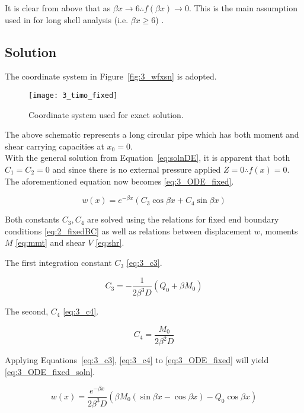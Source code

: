 It is clear from above that as $\beta x \rightarrow 6 \therefore f(\beta x) \rightarrow 0$. This is the main assumption used in for long shell analysis (i.e. $\beta x \geq 6$) \citep{roarks}.

\subsection{Solution}

The coordinate system in Figure~\ref{fig:3_wfxsn} is adopted.
\begin{figure}[H]
	\centering
	\texttt{[image: 3\_timo\_fixed]}
	\caption{Coordinate system used for exact solution. \citep{timoshenko1959theory}}
	\label{fig:CoordSyst}
\end{figure}

The above schematic represents a long circular pipe which has both moment and shear carrying capacities at $x_0=0$.\\

With the general solution from Equation~\ref{eq:solnDE}, it is apparent that both $C_1=C_2=0$ and since there is no external pressure applied $Z=0 \therefore f(x) = 0$. The aforementioned equation now becomes \ref{eq:3_ODE_fixed}.

\begin{equation}
	\label{eq:3_ODE_fixed}
	w(x)=e^{-\beta x} \left(C_3 \cos \beta x +C_4 \sin \beta x \right)
\end{equation}


Both constants $C_3, C_4$ are solved using the relations for fixed end boundary conditions \ref{eq:2_fixedBC} as well as relations between displacement $w$, moments $M$ \ref{eq:mmt} and shear $V$ \ref{eq:shr}.


The first integration constant $C_3$ \ref{eq:3_c3}.

\begin{equation}
	\label{eq:3_c3}
	C_3 = - \frac{1}{2 \beta^3 D} \left( Q_0 + \beta M_0 \right)
\end{equation}

The second, $C_4$ \ref{eq:3_c4}.

\begin{equation}
	\label{eq:3_c4}
	C_4 = \frac{M_0}{2 \beta^2 D}
\end{equation}


Applying Equations~\ref{eq:3_c3}, \ref{eq:3_c4} to \ref{eq:3_ODE_fixed} will yield \ref{eq:3_ODE_fixed_soln}.

\begin{equation}
	\label{eq:3_ODE_fixed_soln}
	w(x)= \frac{e^{-\beta x}}{2 \beta^3 D} \left( \beta M_0 (\sin \beta x -\cos \beta x) - Q_0 \cos \beta x  \right)
\end{equation}

